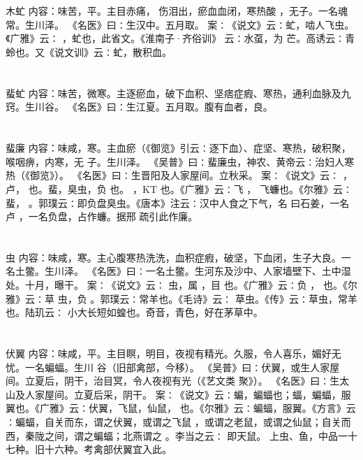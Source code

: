 \documentclass[12pt,UTF8]{ctexbook}
\begin{document}
\section{}木虻
内容：味苦，平。主目赤痛， 伤泪出，瘀血血闭，寒热酸 ，无子。一名魂常。生川泽。 
《名医》曰∶生汉中。五月取。 
案∶《说文》云∶虻，啮人飞虫。《广雅》云∶ ，虻也，此省文。《淮南子·齐俗训》 
云∶水虿，为 芒。高诱云∶青蛉也。又《说文训》云∶虻，散积血。 


\section{}蜚虻
内容：味苦，微寒。主逐瘀血，破下血积、坚痞症瘕、寒热，通利血脉及九窍。生川谷。 
《名医》曰∶生江夏。五月取。腹有血者，良。 


\section{}蜚廉
内容：味咸，寒。主血瘀（《御览》引云∶逐下血）、症坚、寒热，破积聚，喉咽痹，内寒，无 
子。生川泽。 
《吴普》曰∶蜚廉虫，神农、黄帝云∶治妇人寒热（《御览》）。 
《名医》曰∶生晋阳及人家屋间。立秋采。 
案∶《说文》云∶ ，卢， 也。蜚，臭虫，负 也。 ，KT 也。《广雅》云∶飞 
， 
飞蠊也。《尔雅》云∶蜚， 。郭璞云∶即负盘臭虫。《唐本》注云∶汉中人食之下气，名 
曰石姜，一名卢 ，一名负盘，占作蠊。据邢 疏引此作廉。 


\section{}虫
内容：味咸，寒。主心腹寒热洗洗，血积症瘕，破坚，下血闭，生子大良。一名土鳖。生川泽。 
《名医》曰∶一名土鳖。生河东及沙中、人家墙壁下、土中湿处。十月，曝干。 
案∶《说文》云∶ 虫，属 ，目 也。《广雅》云∶负 ， 也。《尔雅》云∶草 
虫，负 。郭璞云∶常羊也。《毛诗》云∶ 草虫。《传》云∶草虫，常羊也。陆玑云∶ 
小大长短如蝗也。奇音，青色，好在茅草中。 


\section{}伏翼
内容：味咸，平。主目瞑，明目，夜视有精光。久服，令人喜乐，媚好无忧。一名蝙蝠。生川 
谷（旧部禽部，今移）。 
《吴普》曰∶伏翼，或生人家屋间。立夏后，阴干，治目冥，令人夜视有光（《艺文类 
聚》）。 
《名医》曰∶生太山及人家屋间。立夏后采，阴干。 
案∶《说文》云∶蝙，蝙蝠也；蝠，蝙蝠，服翼也。《广雅》云∶伏翼，飞鼠，仙鼠， 
也。《尔雅》云∶蝙蝠，服翼。《方言》云∶蝙蝠，自关而东，谓之伏翼，或谓之飞鼠 
，或谓之老鼠，或谓之仙鼠；自关而西，秦陇之间，谓之蝙蝠；北燕谓之 。李当之云∶ 
即天鼠。 
上虫、鱼，中品一十七种。旧十六种。考禽部伏翼宜入此。 
\end{document}
